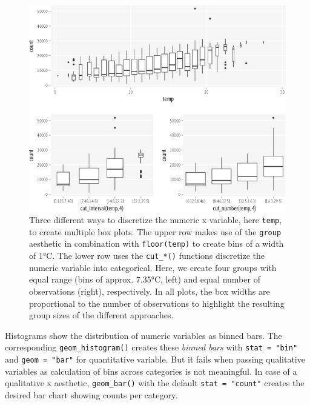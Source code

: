 \documentclass[
]{krantz}
\begin{document}
\begin{figure}
\centering
\includegraphics{bookdown_files/figure-latex/07layerPositionalTypeBoxplotCut2-1.png}
\caption{\label{fig:07layerPositionalTypeBoxplotCut2}Three different ways to discretize the numeric x variable, here \texttt{temp}, to create multiple box plots. The upper row makes use of the \texttt{group} aesthetic in combination with \texttt{floor(temp)} to create bins of a width of 1°C. The lower row uses the \texttt{cut\_*()} functions discretize the numeric variable into categorical. Here, we create four groups with equal range (bins of approx. 7.35°C, left) and equal number of observations (right), respectively. In all plots, the box widths are proportional to the number of observations to highlight the resulting group sizes of the different approaches.}
\end{figure}

Histograms show the distribution of numeric variables as binned bars. The corresponding \texttt{geom\_histogram()} creates these \emph{binned bars} with \texttt{stat\ =\ "bin"} and \texttt{geom\ =\ "bar"} for quantitative variable. But it fails when passing qualitative variables as calculation of bins across categories is not meaningful. In case of a qualitative x aesthetic, \texttt{geom\_bar()} with the default \texttt{stat\ =\ "count"} creates the desired bar chart showing counts per category.
\end{document}
